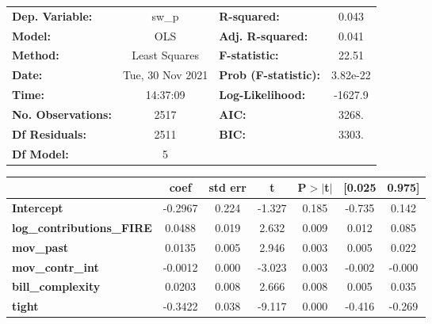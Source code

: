 \begin{center}
\begin{tabular}{lclc}
\toprule
\textbf{Dep. Variable:}           &      sw\_p       & \textbf{  R-squared:         } &     0.043   \\
\textbf{Model:}                   &       OLS        & \textbf{  Adj. R-squared:    } &     0.041   \\
\textbf{Method:}                  &  Least Squares   & \textbf{  F-statistic:       } &     22.51   \\
\textbf{Date:}                    & Tue, 30 Nov 2021 & \textbf{  Prob (F-statistic):} &  3.82e-22   \\
\textbf{Time:}                    &     14:37:09     & \textbf{  Log-Likelihood:    } &   -1627.9   \\
\textbf{No. Observations:}        &        2517      & \textbf{  AIC:               } &     3268.   \\
\textbf{Df Residuals:}            &        2511      & \textbf{  BIC:               } &     3303.   \\
\textbf{Df Model:}                &           5      & \textbf{                     } &             \\
\bottomrule
\end{tabular}
\begin{tabular}{lcccccc}
                                  & \textbf{coef} & \textbf{std err} & \textbf{t} & \textbf{P$> |$t$|$} & \textbf{[0.025} & \textbf{0.975]}  \\
\midrule
\textbf{Intercept}                &      -0.2967  &        0.224     &    -1.327  &         0.185        &       -0.735    &        0.142     \\
\textbf{log\_contributions\_FIRE} &       0.0488  &        0.019     &     2.632  &         0.009        &        0.012    &        0.085     \\
\textbf{mov\_past}                &       0.0135  &        0.005     &     2.946  &         0.003        &        0.005    &        0.022     \\
\textbf{mov\_contr\_int}          &      -0.0012  &        0.000     &    -3.023  &         0.003        &       -0.002    &       -0.000     \\
\textbf{bill\_complexity}         &       0.0203  &        0.008     &     2.666  &         0.008        &        0.005    &        0.035     \\
\textbf{tight}                    &      -0.3422  &        0.038     &    -9.117  &         0.000        &       -0.416    &       -0.269     \\

\end{tabular}
\end{center}
